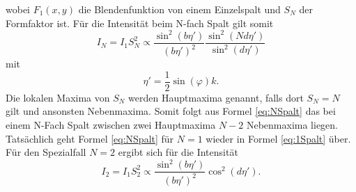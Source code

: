 wobei $F_1(x,y)$ die Blendenfunktion von einem Einzelspalt und $S_N$ der Formfaktor ist.
Für die Intensität beim N-fach Spalt gilt somit
\begin{equation}
	I_N = I_1 S_N^2 \propto \frac{\sin^2(b \eta')}{(b\eta')^2}\frac{\sin^2(N d \eta')}{\sin^2(d\eta')}\label{eq:NSpalt}
\end{equation}
mit
\begin{equation}
	\eta'=\frac{1}{2} \sin(\varphi) k.
\end{equation}
Die lokalen Maxima von $S_N$ werden Hauptmaxima genannt, falls dort $S_N=N$ gilt und ansonsten Nebenmaxima. Somit folgt aus Formel \eqref{eq:NSpalt} das bei einem N-Fach Spalt zwischen zwei Hauptmaxima $N-2$ Nebenmaxima liegen.
Tatsächlich geht Formel \eqref{eq:NSpalt} für $N=1$ wieder in Formel \eqref{eq:1Spalt} über.
Für den Spezialfall $N=2$ ergibt sich für die Intensität
\begin{equation}
	I_2=I_1 S_2^2\propto \frac{\sin^2(b \eta')}{(b\eta')^2} \cos^2(d \eta').
\end{equation}

